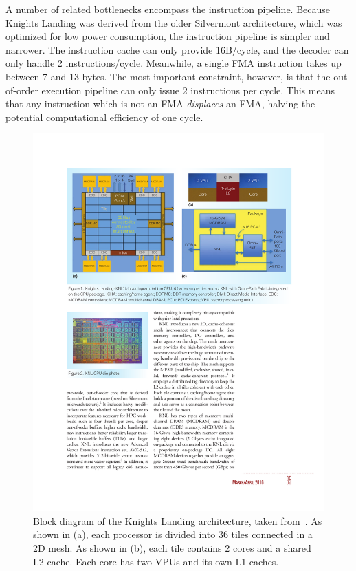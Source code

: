 A number of related bottlenecks encompass the instruction pipeline. Because Knights Landing was derived from the older Silvermont architecture, which was optimized for low power consumption, the instruction pipeline is simpler and narrower. The instruction cache can only provide 16B/cycle, and the decoder can only handle 2 instructions/cycle. Meanwhile, a single \gls{FMA} instruction takes up between 7 and 13 bytes. The most important constraint, however, is that the out-of-order execution pipeline can only issue 2 instructions per cycle. This means that any instruction which is not an FMA \emph{displaces} an FMA, halving the potential computational efficiency of one cycle.


\begin{figure}[tb]
\centering
\includegraphics[width=\textwidth]{images/knl_arch.pdf}
\caption{Block diagram of the Knights Landing architecture, taken from~\cite{Sodani:2016:KLS:2927511.2927563}. As shown in (a), each processor is divided into 36 tiles connected in a 2D mesh. As shown in (b), each tile contains 2 cores and a shared L2 cache. Each core has two VPUs and its own L1 caches.}
\end{figure}

